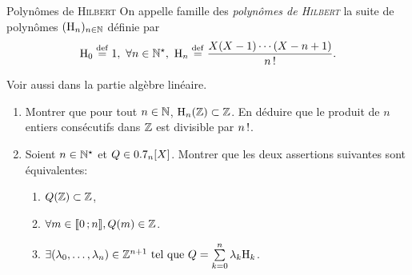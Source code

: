 \begin{defi}{Polynômes de \textsc{Hilbert}}
    On appelle famille des \emph{polynômes de \textsc{Hilbert}} la suite de polynômes $(\mathrm{H}_n)_{n \in \mathbb{N}}$ définie par
    $$\Hilb_0 \defeq 1,\ \forall n \in \Ne,\ \Hilb_n \defeq \frac{X(X-1)\cdots(X-n+1)}{\fact{n}}.$$
\end{defi}

Voir aussi  dans la partie algèbre linéaire. 

\begin{exercice}
    \begin{enumerate}
        \item Montrer que pour tout $n \in \mathbb{N}$, $\mathrm{H}_n(\mathbb{Z}) \subset \mathbb{Z}$. En déduire que le produit de $n$ entiers consécutifs dans $\mathbb{Z}$ est divisible par $n\,!$.
        \item Soient $n \in \mathbb{N}^\star$ et $Q \in 0.7_n[X]$. Montrer que les deux assertions suivantes sont équivalentes:
        \begin{enumerate}[label=(\roman*)]
            \item $Q(\mathbb{Z}) \subset \mathbb{Z}$,
            \item $\forall m \in \llbracket 0\,; n \rrbracket, Q(m) \in \mathbb{Z}$.
            \item $\exists (\lambda_0, \dots, \lambda_n) \in \mathbb{Z}^{n+1} \text{ tel que } Q = \sum\limits_{k=0}^n \lambda_k \mathrm{H}_k$.
        \end{enumerate}
    \end{enumerate}
\end{exercice}

\begin{solution}
\end{solution}
